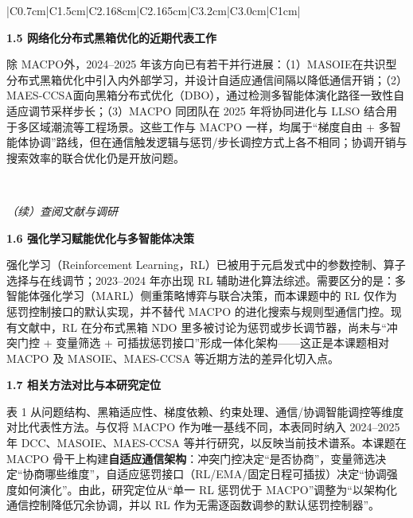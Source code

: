 \begin{center}
\begin{tabular}{|C{0.7cm}|C{1.5cm}|C{2.168cm}|C{2.165cm}|C{3.2cm}|C{3.0cm}|C{1cm}|}
{{    \indent\textbf{1.5 网络化分布式黑箱优化的近期代表工作}
    
    除 MACPO\cite{chen2024macpo}外，2024--2025 年该方向已有若干并行进展：（1）MASOIE\cite{chen2024maso}在共识型分布式黑箱优化中引入内外部学习，并设计自适应通信间隔以降低通信开销；（2）MAES-CCSA\cite{guo2025maes}面向黑箱分布式优化（DBO），通过检测多智能体演化路径一致性自适应调节采样步长；（3）MACPO 同团队在 2025 年将协同进化与 LLSO 结合用于多区域潮流等工程场景\cite{qiu2025opf}。这些工作与 MACPO 一样，均属于“梯度自由 + 多智能体协调”路线，但在通信触发逻辑与惩罚/步长调控方式上各不相同；协调开销与搜索效率的联合优化仍是开放问题\cite{zhou2024highdim}。

}}
    \\
    \hline
    \end{tabular}
    \end{center}


\clearpage
\EnableSectionPageBorder

\vspace{0.2cm}
{\small\noindent\textit{（续）查阅文献与调研}}
\par
\indent
\textbf{1.6 强化学习赋能优化与多智能体决策}
\par
强化学习（Reinforcement Learning，RL）已被用于元启发式中的参数控制、算子选择与在线调节\cite{karafotias2015}；2023--2024 年亦出现 RL 辅助进化算法综述\cite{song2024}。需要区分的是：多智能体强化学习（MARL）侧重策略博弈与联合决策\cite{busoniu2008}，而本课题中的 RL 仅作为惩罚控制接口的默认实现，并不替代 MACPO 的进化搜索与规则型通信门控。现有文献中，RL 在分布式黑箱 NDO 里多被讨论为惩罚或步长调节器，尚未与“冲突门控 + 变量筛选 + 可插拔惩罚接口”形成一体化架构——这正是本课题相对 MACPO 及 MASOIE、MAES-CCSA 等近期方法的差异化切入点。

\par
\indent
\textbf{1.7 相关方法对比与本研究定位}
\par
表 1 从问题结构、黑箱适应性、梯度依赖、约束处理、通信/协调智能调控等维度对比代表性方法。与仅将 MACPO 作为唯一基线不同，本表同时纳入 2024--2025 年 DCC、MASOIE、MAES-CCSA 等并行研究，以反映当前技术谱系。本课题在 MACPO 骨干上构建\textbf{自适应通信架构}：冲突门控决定“是否协商”，变量筛选决定“协商哪些维度”，自适应惩罚接口（RL/EMA/固定日程可插拔）决定“协调强度如何演化”。由此，研究定位从“单一 RL 惩罚优于 MACPO”调整为“以架构化通信控制降低冗余协调，并以 RL 作为无需逐函数调参的默认惩罚控制器”。

